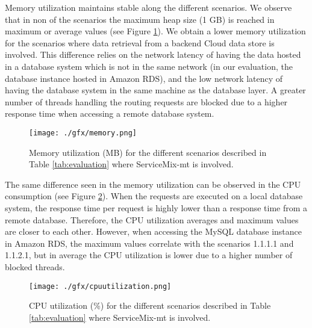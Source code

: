 \FloatBarrier

Memory utilization maintains stable along the different scenarios. We observe that in non of the scenarios the maximum heap size (1 GB) is reached in maximum or average values (see Figure \ref{fig:memory}). We obtain a lower memory utilization for the scenarios where data retrieval from a backend Cloud data store is involved. This difference relies on the network latency of having the data hosted in a database system which is not in the same network (in our evaluation, the database instance hosted in Amazon RDS), and the low network latency of having the database system in the same machine as the database layer. A greater number of threads handling the routing requests are blocked due to a higher response time when accessing a remote database system. 

\begin{figure}[htb]
	\centering
		\texttt{[image: ./gfx/memory.png]}
	\caption[Evaluation Analysis - Memory Utilization]{Memory utilization (MB) for the different scenarios described in Table \ref{tab:evaluation} where ServiceMix-mt is involved.}
	\label{fig:memory}
\end{figure}

The same difference seen in the memory utilization can be observed in the CPU consumption (see Figure \ref{fig:cpuutilization}). When the requests are executed on a local database system, the response time per request is highly lower than a response time from a remote database. Therefore, the CPU utilization averages and maximum values are closer to each other. However, when accessing the MySQL database instance in Amazon RDS, the maximum values correlate with the scenarios 1.1.1.1 and 1.1.2.1, but in average the CPU utilization is lower due to a higher number of blocked threads.

\begin{figure}[htb]
	\centering
		\texttt{[image: ./gfx/cpuutilization.png]}
	\caption[Evaluation Analysis - CPU Utilization]{CPU utilization (\%) for the different scenarios described in Table \ref{tab:evaluation} where ServiceMix-mt is involved.}
	\label{fig:cpuutilization}
\end{figure}

\FloatBarrier